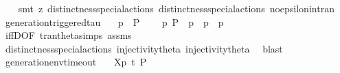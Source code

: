 \begin{isabellebody}
\ \ \isamarkupfalse%
\ {\isacharparenleft}{\kern0pt}smt\ {\isacharparenleft}{\kern0pt}z{}{\isacharparenright}{\kern0pt}\ distinctness{\isacharunderscore}{\kern0pt}special{\isacharunderscore}{\kern0pt}actions{\isacharparenleft}{\kern0pt}{}{\isacharparenright}{\kern0pt}\ distinctness{\isacharunderscore}{\kern0pt}special{\isacharunderscore}{\kern0pt}actions{\isacharparenleft}{\kern0pt}{}{\isacharparenright}{\kern0pt}\ no{\isacharunderscore}{\kern0pt}epsilon{\isacharunderscore}{\kern0pt}in{\isacharunderscore}{\kern0pt}tran{\isacharparenleft}{\kern0pt}{}{\isacharparenright}{\kern0pt}{\isacharparenright}{\kern0pt}%
\endisatagproof
{\isafoldproof}%
%
\isadelimproof
\isanewline
%
\endisadelimproof
\isanewline
{}\isamarkupfalse%
\ generation{\isacharunderscore}{\kern0pt}triggered{\isacharunderscore}{\kern0pt}tau{\isacharcolon}{\kern0pt}\isanewline
\ \ \ {\isacartoucheopen}{\isasymtheta}{\isacharparenleft}{\kern0pt}p{\isacharparenright}{\kern0pt}\ {\isasymlongmapsto}\isactrlsup {\isasymtheta}{\isasymtau}\ P{\isacharprime}{\kern0pt}{\isacartoucheclose}\isanewline
\ \ \ {\isacartoucheopen}{\isasymexists}\ p{\isacharprime}{\kern0pt}{\isachardot}{\kern0pt}\ P{\isacharprime}{\kern0pt}\ {\isacharequal}{\kern0pt}\ {\isasymtheta}{\isacharparenleft}{\kern0pt}p{\isacharprime}{\kern0pt}{\isacharparenright}{\kern0pt}\ {\isasymand}\ p\ {\isasymlongmapsto}{\isasymtau}\ p{\isacharprime}{\kern0pt}{\isacartoucheclose}\isanewline
%
\isadelimproof
\ \ %
\endisadelimproof
%
\isatagproof
{}\isamarkupfalse%
\ iffD{}{\isacharbrackleft}{\kern0pt}OF\ tran{\isacharunderscore}{\kern0pt}theta{\isachardot}{\kern0pt}simps\ assms{\isacharbrackright}{\kern0pt}\isanewline
\ \ \isamarkupfalse%
\ distinctness{\isacharunderscore}{\kern0pt}special{\isacharunderscore}{\kern0pt}actions{\isacharparenleft}{\kern0pt}{}{\isacharparenright}{\kern0pt}\ injectivity{\isacharunderscore}{\kern0pt}theta{\isacharparenleft}{\kern0pt}{}{\isacharparenright}{\kern0pt}\ injectivity{\isacharunderscore}{\kern0pt}theta{\isacharparenleft}{\kern0pt}{}{\isacharparenright}{\kern0pt}\ \isamarkupfalse%
\ blast%
\endisatagproof
{\isafoldproof}%
%
\isadelimproof
\isanewline
%
\endisadelimproof
\ \ \isanewline
{}\isamarkupfalse%
\ generation{\isacharunderscore}{\kern0pt}env{\isacharunderscore}{\kern0pt}timeout{\isacharcolon}{\kern0pt}\isanewline
\ \ \ {\isacartoucheopen}{\isasymtheta}{\isacharbrackleft}{\kern0pt}X{\isacharbrackright}{\kern0pt}{\isacharparenleft}{\kern0pt}p{\isacharparenright}{\kern0pt}\ {\isasymlongmapsto}\isactrlsup {\isasymtheta}t{\isacharunderscore}{\kern0pt}{\isasymepsilon}\ P{\isacharprime}{\kern0pt}{\isacartoucheclose}\isanewline

\end{isabellebody}

